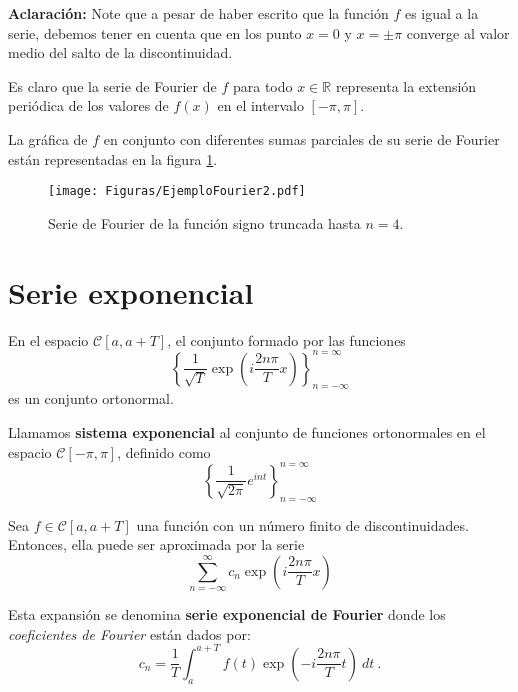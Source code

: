 \begin{ejemplo}
\textbf{Aclaración:} Note que a pesar de haber escrito que la función $f$ es igual a la serie, debemos tener en cuenta que en los punto $x = 0$ y $x = \pm \pi$ converge al valor medio del salto de la discontinuidad.

Es claro que la serie de Fourier de $f$ para todo $x\in \mathbb{R}$ representa la extensión periódica de los valores de $f(x)$ en el intervalo $[-\pi,\pi]$.

La gráfica de $f$ en conjunto con diferentes sumas parciales de su serie de Fourier están representadas en la figura \ref{fig:EjemploFourier2}.

\begin{figure}[H]
    \centering
    \texttt{[image: Figuras/EjemploFourier2.pdf]}
    \caption{Serie de Fourier de la función signo truncada hasta $n = 4$.}
     \label{fig:EjemploFourier2}
\end{figure}

\end{ejemplo}

\section{Serie exponencial}

\begin{propo}
    En el espacio $\mathscr{C}[a,a+T]$, el conjunto formado por las funciones 
    \begin{equation}
        \left\{ \frac{1}{\sqrt{T}} \exp\left(i\frac{2n\pi}{T}x\right) \right\}_{n= - \infty}^{n = \infty}
    \end{equation}
    es un conjunto ortonormal.
\end{propo}

\begin{defi} 
    Llamamos \textbf{sistema exponencial} al conjunto de funciones ortonormales en el espacio $\mathscr{C}[-\pi,\pi]$, definido como 
    $$\left\{ \frac{1}{\sqrt{2\pi}} e^{int} \right\}_{n= - \infty}^{n = \infty}$$
\end{defi}

\begin{defi} 
Sea $f \in \mathscr{C}[a,a+T]$ una función con un número finito de discontinuidades. Entonces, ella puede ser aproximada por la serie 
\begin{equation}
     \sum_{n=- \infty}^{\infty} c_n \exp\left(i\frac{2n\pi}{T}x\right) \label{FourierExpo}
\end{equation}

Esta expansión se denomina \textbf{serie exponencial de Fourier}  donde los \textit{coeficientes de Fourier} están dados por:
\begin{equation*}
    c_n = \frac{1}{T} \int_{a}^{a+T} f(t) \exp\left(-i\frac{2n\pi}{T}t \right) \ dt \ .
\end{equation*}
\end{defi}

